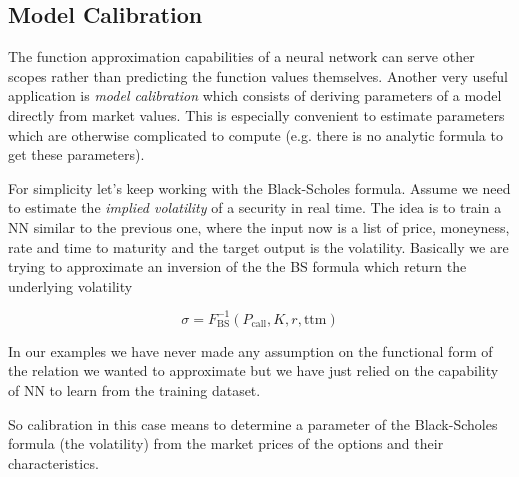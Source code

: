\subsection{Model Calibration}\label{model-calibration}

The function approximation capabilities of a neural network can serve
other scopes rather than predicting the function values themselves. Another very useful
application is \emph{model calibration} which consists of
deriving parameters of a model directly from market values. This is
especially convenient to estimate parameters which are
otherwise complicated to compute (e.g. there is no analytic formula to get these parameters).

For simplicity let's keep working with the Black-Scholes formula.
Assume we need to estimate the \emph{implied volatility} of a security in real time. 
The idea is to train a NN similar to the previous one, where the input now is a list of price,
moneyness, rate and time to maturity and the target output is the
volatility. Basically we are trying to approximate an inversion of the the BS formula which
return the underlying volatility

\begin{equation} 
	\sigma = F^{-1}_\textrm{BS}(P_\textrm{call}, K, r, \mathrm{ttm})
\end{equation}

In our examples we have never made any assumption on the functional form of the relation we wanted to approximate
but we have just relied on the capability of NN to learn from the training dataset. 

So calibration in this case means to determine a parameter of the Black-Scholes formula (the volatility) from 
the market prices of the options and their characteristics.

